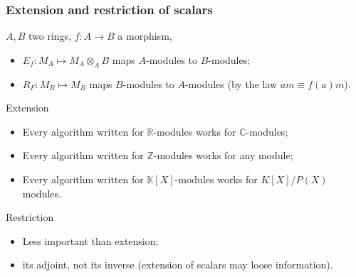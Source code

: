 \documentclass[10pt]{beamer}
\newcommand{\Z}{\mathbb{Z}}
\newcommand{\Complex}{\mathbb{C}}
\newcommand{\R}{\mathbb{R}}
\newcommand{\K}{\mathbb{K}}
\newcommand{\ra}{\rightarrow}
\begin{document}
\begin{frame}
  \frametitle{Extension and restriction of scalars}

  \begin{block}{}
    $A,B$ two rings, $f:A\ra B$ a morphism,
    \begin{itemize}
    \item $E_f : M_A\mapsto M_A\otimes_AB$ maps $A$-modules to
      $B$-modules;
    \item $R_F : M_B\mapsto M_B$ maps $B$-modules to $A$-modules (by
      the law $am \equiv f(a)m$).
    \end{itemize}
  \end{block}

  \begin{block}{Extension}
    \begin{itemize}
    \item Every algorithm written for $\R$-modules works for
      $\Complex$-modules;
    \item Every algorithm written for $\Z$-modules works for any module;
    \item Every algorithm written for $\K[X]$-modules works for
      $K[X]/P(X)$ modules.
    \end{itemize}
  \end{block}

  \begin{block}{Restriction}
    \begin{itemize}
    \item Less important than extension;
    \item its \alert{adjoint}, not its inverse (extension of scalars
      may loose information).
    \end{itemize}
  \end{block}
\end{frame}
\end{document}
